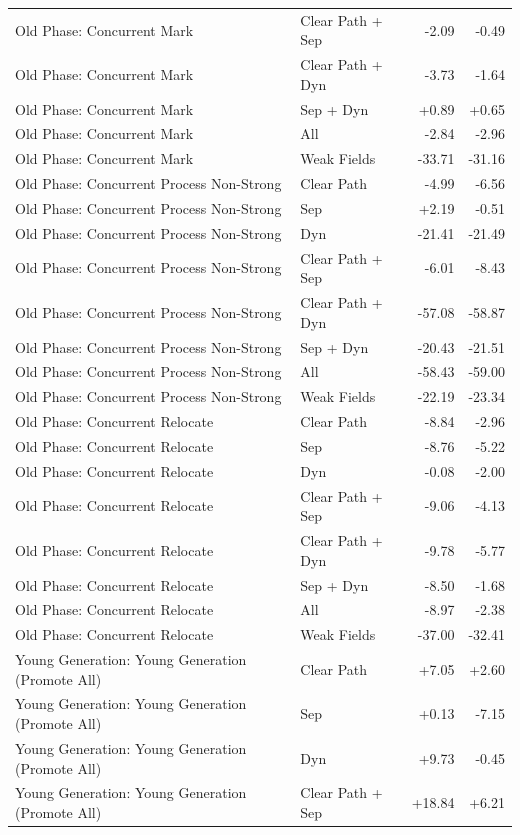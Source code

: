 \begin{table}[t]
\begin{tabular}{llrr}
Old Phase: Concurrent Mark & Clear Path + Sep & -2.09 & -0.49 \\
Old Phase: Concurrent Mark & Clear Path + Dyn & -3.73 & -1.64 \\
Old Phase: Concurrent Mark & Sep + Dyn & +0.89 & +0.65 \\
Old Phase: Concurrent Mark & All & -2.84 & -2.96 \\
Old Phase: Concurrent Mark & Weak Fields & -33.71 & -31.16 \\
Old Phase: Concurrent Process Non-Strong & Clear Path & -4.99 & -6.56 \\
Old Phase: Concurrent Process Non-Strong & Sep & +2.19 & -0.51 \\
Old Phase: Concurrent Process Non-Strong & Dyn & -21.41 & -21.49 \\
Old Phase: Concurrent Process Non-Strong & Clear Path + Sep & -6.01 & -8.43 \\
Old Phase: Concurrent Process Non-Strong & Clear Path + Dyn & -57.08 & -58.87 \\
Old Phase: Concurrent Process Non-Strong & Sep + Dyn & -20.43 & -21.51 \\
Old Phase: Concurrent Process Non-Strong & All & -58.43 & -59.00 \\
Old Phase: Concurrent Process Non-Strong & Weak Fields & -22.19 & -23.34 \\
Old Phase: Concurrent Relocate & Clear Path & -8.84 & -2.96 \\
Old Phase: Concurrent Relocate & Sep & -8.76 & -5.22 \\
Old Phase: Concurrent Relocate & Dyn & -0.08 & -2.00 \\
Old Phase: Concurrent Relocate & Clear Path + Sep & -9.06 & -4.13 \\
Old Phase: Concurrent Relocate & Clear Path + Dyn & -9.78 & -5.77 \\
Old Phase: Concurrent Relocate & Sep + Dyn & -8.50 & -1.68 \\
Old Phase: Concurrent Relocate & All & -8.97 & -2.38 \\
Old Phase: Concurrent Relocate & Weak Fields & -37.00 & -32.41 \\
Young Generation: Young Generation (Promote All) & Clear Path & +7.05 & +2.60 \\
Young Generation: Young Generation (Promote All) & Sep & +0.13 & -7.15 \\
Young Generation: Young Generation (Promote All) & Dyn & +9.73 & -0.45 \\
Young Generation: Young Generation (Promote All) & Clear Path + Sep & +18.84 & +6.21 \\

\end{tabular}
\end{table}
